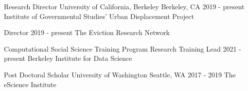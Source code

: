 

\begin{cventries}



  \cventry
    {Research Director} %
    {University of California, Berkeley} %
    {Berkeley, CA} %
    {2019 - present} %
    {Institute of Governmental Studies' Urban Displacement Project}

  \cventry
    {Director} %
    {} %
    {} %
    {2019 - present} %
    {The Eviction Research Network}    

  \cventry
    {Computational Social Science Training Program Research Training Lead} %
    {} %
    {} %
    {2021 - present} %
    {Berkeley Institute for Data Science\newline}

  \cventry
    {Post Doctoral Scholar} %
    {University of Washington} %
    {Seattle, WA} %
    {2017 - 2019} %
    {The eScience Institute}

\end{cventries}